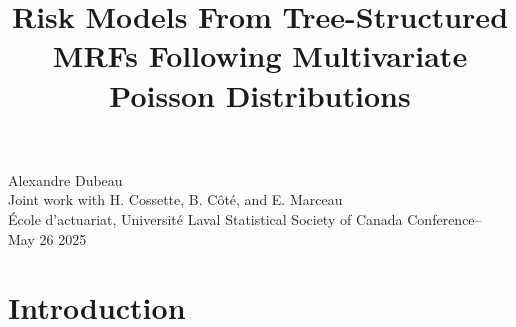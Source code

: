 \documentclass[11pt,xcolor={dvipsnames},hyperref={pdftex,pdfpagemode=UseNone,hidelinks,pdfdisplaydoctitle=true},usepdftitle=false]{beamer}
\begin{document}
\title{Risk Models From Tree-Structured MRF{\Large s} Following Multivariate Poisson Distributions}


\information
%
%
{
\Large Alexandre Dubeau\\
\smallskip \large Joint work with H. Cossette, B. Côté, and E. Marceau\\
\normalsize École d'actuariat, Université Laval}
%
{Statistical Society of Canada Conference-- May 26 2025}

\frame{\titlepage}

\section{Introduction}

\end{document}
